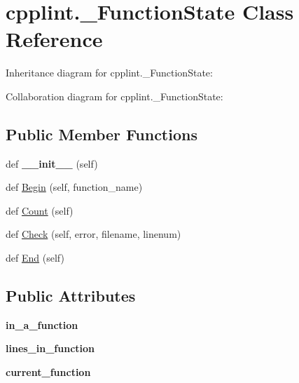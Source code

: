 \hypertarget{classcpplint_1_1__FunctionState}{}\section{cpplint.\+\_\+\+Function\+State Class Reference}
\label{classcpplint_1_1__FunctionState}


Inheritance diagram for cpplint.\+\_\+\+Function\+State\+:


Collaboration diagram for cpplint.\+\_\+\+Function\+State\+:
\subsection*{Public Member Functions}
\begin{DoxyCompactItemize}
\item 
\mbox{\label{classcpplint_1_1__FunctionState_a3f6a865710852cc74c6a7085180458ae}} 
def {\bfseries \+\_\+\+\_\+init\+\_\+\+\_\+} (self)
\item 
def \hyperlink{classcpplint_1_1__FunctionState_a41215c4d73baccbb340f6d0df1c1f4b3}{Begin} (self, function\+\_\+name)
\item 
def \hyperlink{classcpplint_1_1__FunctionState_ac25c9711911ae181b091b52619cf2701}{Count} (self)
\item 
def \hyperlink{classcpplint_1_1__FunctionState_a5e4ad7d7b104038b45204ab4abf527b2}{Check} (self, error, filename, linenum)
\item 
def \hyperlink{classcpplint_1_1__FunctionState_a1ab6b0a575c25c135f9004b7fb12dc4a}{End} (self)
\end{DoxyCompactItemize}
\subsection*{Public Attributes}
\begin{DoxyCompactItemize}
\item 
\mbox{\label{classcpplint_1_1__FunctionState_a8362d472591f60462184bf68b49c0efb}} 
{\bfseries in\+\_\+a\+\_\+function}
\item 
\mbox{\label{classcpplint_1_1__FunctionState_a886f5d476adc81f499a711750a399aa2}} 
{\bfseries lines\+\_\+in\+\_\+function}
\item 
\mbox{\label{classcpplint_1_1__FunctionState_a320674f54bd75087febc8f0d83620569}} 
{\bfseries current\+\_\+function}
\end{DoxyCompactItemize}


